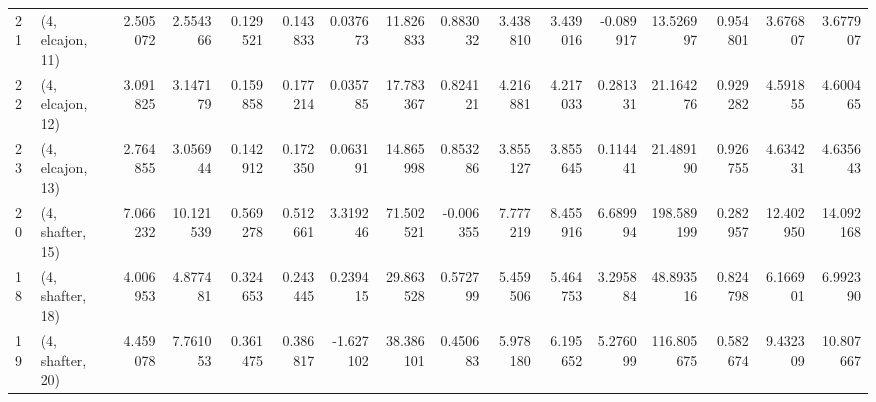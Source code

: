 \begin{tabular}{llrrrrrrrrrrrrrr}
21 &  (4, elcajon, 11) &  2.505072 &   2.554366 &   0.129521 &  0.143833 &  0.037673 &   11.826833 &  0.883032 &   3.438810 &   3.439016 &  -0.089917 &   13.526997 &  0.954801 &   3.676807 &   3.677907 \\
22 &  (4, elcajon, 12) &  3.091825 &   3.147179 &   0.159858 &  0.177214 &  0.035785 &   17.783367 &  0.824121 &   4.216881 &   4.217033 &   0.281331 &   21.164276 &  0.929282 &   4.591855 &   4.600465 \\
23 &  (4, elcajon, 13) &  2.764855 &   3.056944 &   0.142912 &  0.172350 &  0.063191 &   14.865998 &  0.853286 &   3.855127 &   3.855645 &   0.114441 &   21.489190 &  0.926755 &   4.634231 &   4.635643 \\
20 &  (4, shafter, 15) &  7.066232 &  10.121539 &   0.569278 &  0.512661 &  3.319246 &   71.502521 & -0.006355 &   7.777219 &   8.455916 &   6.689994 &  198.589199 &  0.282957 &  12.402950 &  14.092168 \\
18 &  (4, shafter, 18) &  4.006953 &   4.877481 &   0.324653 &  0.243445 &  0.239415 &   29.863528 &  0.572799 &   5.459506 &   5.464753 &   3.295884 &   48.893516 &  0.824798 &   6.166901 &   6.992390 \\
19 &  (4, shafter, 20) &  4.459078 &   7.761053 &   0.361475 &  0.386817 & -1.627102 &   38.386101 &  0.450683 &   5.978180 &   6.195652 &   5.276099 &  116.805675 &  0.582674 &   9.432309 &  10.807667 \\
\bottomrule
\end{tabular}
